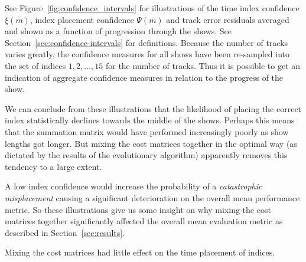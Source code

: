 \documentclass[twocolumn]{article}
\begin{document}
See Figure~\ref{fig:confidence_intervals} for illustrations of the time index confidence $\xi(\bar m)$, index placement confidence $\Psi(\bar m)$ and track error residuals averaged and shown as a function of progression through the shows. See Section~\ref{sec:confidence-intervals} for definitions. Because the number of tracks varies greatly, the confidence measures for all shows have been re-sampled into the set of indices $1,2,\ldots,15$ for the number of tracks. Thus it is possible to get an indication of aggregate confidence measures in relation to the progress of the show. 

We can conclude from these illustrations that the likelihood of placing the correct index statistically declines towards the middle of the shows. Perhaps this means that the summation matrix would have performed increasingly poorly as show lengths got longer. But mixing the cost matrices together in the optimal way (as dictated by the results of the evolutionary algorithm) apparently removes this tendency to a large extent. 

A low index confidence would increase the probability of a \textit{catastrophic misplacement} causing a significant deterioration on the overall mean performance metric. So these illustrations give us some insight on why mixing the cost matrices together significantly affected the overall mean evaluation metric as described in Section~\ref{sec:results}.    

Mixing the cost matrices had little effect on the time placement of indices. 
\end{document}
